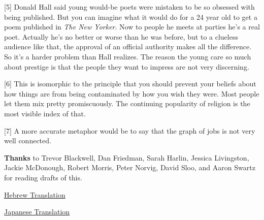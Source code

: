 [5] Donald Hall said young would-be poets were mistaken to be
                  so obsessed with being published. But you can imagine what it
                  would do for a 24 year old to get a poem published in
                  \emph{The New Yorker}. Now to people he meets at parties he's
                  a real poet. Actually he's no better or worse than he was
                  before, but to a clueless audience like that, the approval of
                  an official authority makes all the difference. So it's a
                  harder problem than Hall realizes. The reason the young care
                  so much about prestige is that the people they want to impress
                  are not very discerning.

[6] This is isomorphic to the principle that you should prevent
                  your beliefs about how things are from being contaminated by
                  how you wish they were. Most people let them mix pretty
                  promiscuously. The continuing popularity of religion is the
                  most visible index of that.

[7] A more accurate metaphor would be to say that the graph of
                  jobs is not very well connected.

\textbf{Thanks} to
                  Trevor Blackwell, Dan Friedman, Sarah Harlin, Jessica
                  Livingston, Jackie McDonough, Robert Morris, Peter Norvig,
                  David Sloo, and Aaron Swartz for reading drafts of this.


              
            
          

            
              
            
            
              
                
              
              
              
                \href{http://smallestbusiness.com/heb/blog/how-to-do-what-you-love-hebrew/}{Hebrew Translation}


              
              
              
                
              
              
              
                \href{http://www.naochan.com/deprecated/2006/01/31/}{Japanese Translation}



